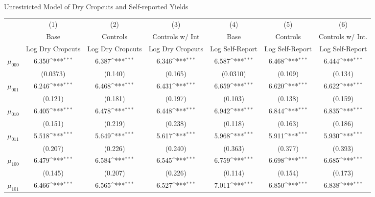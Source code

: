 \centering
\def\sym#1{\ifmmode^{#1}\else\(^{#1}\)\fi}
\caption{Unrestricted Model of Dry Cropcuts and Self-reported Yields }\label{tbl:unres}
\begin{tabular}{l*{6}{c}}
\hline\hline
&\multicolumn{1}{c}{(1)}&\multicolumn{1}{c}{(2)}&\multicolumn{1}{c}{(3)}&\multicolumn{1}{c}{(4)}&\multicolumn{1}{c}{(5)}&\multicolumn{1}{c}{(6)}\\
& Base &   Controls & Controls w/ Int & Base &  Controls & Controls w/ Int. \\
&\multicolumn{1}{c}{Log Dry Cropcuts}&\multicolumn{1}{c}{Log Dry Cropcuts}&\multicolumn{1}{c}{Log Dry Cropcuts}&\multicolumn{1}{c}{Log Self-Report}&\multicolumn{1}{c}{Log Self-Report}&\multicolumn{1}{c}{Log Self-Report}\\
\hline
$\mu_{000}$&    6.350\sym{***}&    6.387\sym{***}&    6.346\sym{***}&    6.587\sym{***}&    6.468\sym{***}&    6.444\sym{***}\\
          & (0.0373)         &  (0.140)         &  (0.165)         & (0.0310)         &  (0.109)         &  (0.134)         \\
$\mu_{001}$&    6.246\sym{***}&    6.468\sym{***}&    6.431\sym{***}&    6.659\sym{***}&    6.620\sym{***}&    6.622\sym{***}\\
          &  (0.121)         &  (0.181)         &  (0.197)         &  (0.103)         &  (0.138)         &  (0.159)         \\
$\mu_{010}$&    6.405\sym{***}&    6.478\sym{***}&    6.448\sym{***}&    6.942\sym{***}&    6.844\sym{***}&    6.835\sym{***}\\
          &  (0.151)         &  (0.219)         &  (0.238)         &  (0.118)         &  (0.163)         &  (0.186)         \\
$\mu_{011}$&    5.518\sym{***}&    5.649\sym{***}&    5.617\sym{***}&    5.968\sym{***}&    5.911\sym{***}&    5.930\sym{***}\\
          &  (0.207)         &  (0.226)         &  (0.240)         &  (0.363)         &  (0.377)         &  (0.393)         \\
$\mu_{100}$&    6.479\sym{***}&    6.584\sym{***}&    6.545\sym{***}&    6.759\sym{***}&    6.698\sym{***}&    6.685\sym{***}\\
          &  (0.145)         &  (0.207)         &  (0.226)         &  (0.114)         &  (0.154)         &  (0.173)         \\
$\mu_{101}$&    6.466\sym{***}&    6.565\sym{***}&    6.527\sym{***}&    7.011\sym{***}&    6.850\sym{***}&    6.838\sym{***}\\

\end{tabular}
